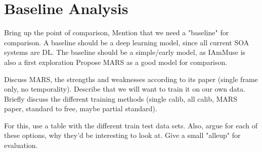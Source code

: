 
\section{Baseline Analysis}
\label{section: setup baseline dataset - baseline analysis}

Bring up the point of comparison, 
Mention that we need a "baseline" for comparison.
A baseline should be a deep learning model, since all current SOA systems are DL.
The baseline should be a simple/early model, as IAmMuse is also a first exploration
Propose MARS as a good model for comparison.

Discuss MARS, the strengths and weaknesses according to its paper (single frame only, no temporality).
Describe that we will want to train it on our own data.
Briefly discuss the different training methods (single calib, all calib, MARS paper, standard to free, maybe partial standard).

For this, use a table with the different train test data sets.
Also, argue for each of these options, why they'd be interesting to look at.
Give a small "alleup" for evaluation.






